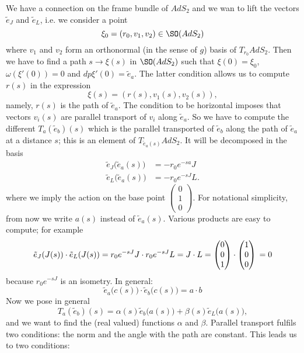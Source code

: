 We have a connection on the frame bundle of $AdS_2$ and we wan to lift the vectors $\tilde{e}_J$ and $\tilde{e}_L$, i.e. we consider a point
\[
	\xi_0=(r_0,v_1,v_2)\in \SO(AdS_2)
\]
where $v_1$ and $v_2$ form an orthonormal (in the sense of $g$) basis of $T_{r_0}AdS_2$. Then we have to find a path $s\to\xi(s)$ in $\SO(AdS_2)$ such that $\xi(0)=\xi_0$, $\omega(\xi'(0))=0$ and $dp\xi'(0)=\tilde{e}_a$. The latter condition allows us to compute $r(s)$ in the expression
\[
	\xi(s)=(r(s),v_1(s),v_2(s)),
\]
namely, $r(s)$ is the path of $\tilde{e}_a$. The condition to be horizontal imposes that vectors $v_i(s)$ are parallel transport of $v_i$ along $\tilde{e}_a$. So we have to compute the different $T_a(\tilde{e}_b)(s)$ which is the parallel transported of $\tilde{e}_b$ along the path of $\tilde{e}_a$ at a distance $s$; this is an element of $T_{\tilde{e}_a(s)}AdS_2$. It will be decomposed in the basis
\[
	\begin{split}
		\tilde{e}_J\big( \tilde{e}_a(s) \big)&=-r_0 e^{-s a}J\\
		\tilde{e}_L\big( \tilde{e}_a(s) \big)&=-r_0 e^{-sJ}L.
	\end{split}
\]
where we imply the action on the base point $\begin{pmatrix}
		0 \\1\\0
	\end{pmatrix}$. For notational simplicity, from now we write $a(s)$ instead of $\tilde{e}_a(s)$. Various products are easy to compute; for example
\[
	\tilde{e}_J(J(s))\cdot\tilde{e}_L(J(s))
	=r_0 e^{-sJ}J\cdot r_0 e^{-sJ}L\\
	=J\cdot L\\
	=\begin{pmatrix}
		0 \\0\\1
	\end{pmatrix}\cdot\begin{pmatrix}
		1 \\0\\0
	\end{pmatrix}\\
	=0
\]
because $r_0 e^{-sJ}$ is an isometry.
In general:
\[
	\tilde{e}_a\big( c(s) \big)\cdot \tilde{e}_b\big( c(s) \big)=a\cdot b
\]
Now we pose in general
\[
	T_a(\tilde{e}_b)(s)=\alpha(s)\tilde{e}_b\big( a(s) \big)+\beta(s)\tilde{e}_L\big( a(s) \big),
\]
and we want to find the (real valued) functions $\alpha$ and $\beta$. Parallel transport fulfils two conditions: the norm and the angle with the path are constant. This leads us to two conditions:
